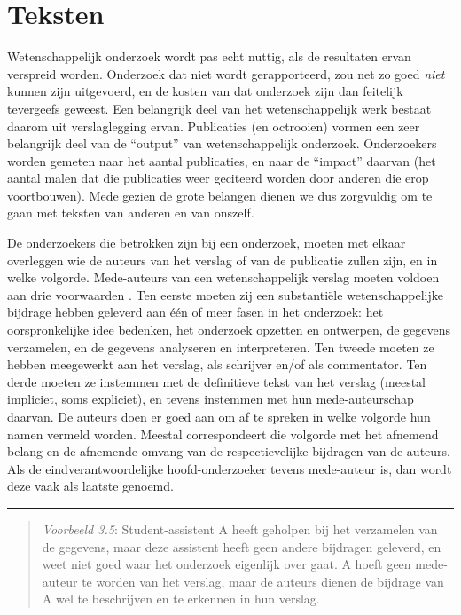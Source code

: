\documentclass[
]{book}
\begin{document}
\section{Teksten}\label{teksten}

Wetenschappelijk onderzoek wordt pas echt nuttig, als de resultaten
ervan verspreid worden. Onderzoek dat niet wordt gerapporteerd, zou net
zo goed \emph{niet} kunnen zijn uitgevoerd, en de kosten van dat onderzoek
zijn dan feitelijk tevergeefs geweest. Een belangrijk deel van het
wetenschappelijk werk bestaat daarom uit verslaglegging ervan.
Publicaties (en octrooien) vormen een zeer belangrijk deel van de
``output'' van wetenschappelijk onderzoek. Onderzoekers worden gemeten
naar het aantal publicaties, en naar de ``impact'' daarvan (het aantal
malen dat die publicaties weer geciteerd worden door anderen die erop
voortbouwen). Mede gezien de grote belangen dienen we dus zorgvuldig om
te gaan met teksten van anderen en van onszelf.

De onderzoekers die betrokken zijn bij een onderzoek, moeten met elkaar
overleggen wie de auteurs van het verslag of van de publicatie zullen
zijn, en in welke volgorde. Mede-auteurs van een wetenschappelijk
verslag moeten voldoen aan drie voorwaarden \citep[Ch.10]{ORI12}. Ten eerste
moeten zij een substantiële wetenschappelijke bijdrage hebben geleverd
aan één of meer fasen in het onderzoek: het oorspronkelijke idee
bedenken, het onderzoek opzetten en ontwerpen, de gegevens verzamelen,
en de gegevens analyseren en interpreteren. Ten tweede moeten ze hebben
meegewerkt aan het verslag, als schrijver en/of als commentator. Ten
derde moeten ze instemmen met de definitieve tekst van het verslag
(meestal impliciet, soms expliciet), en tevens instemmen met hun
mede-auteurschap daarvan. De auteurs doen er goed aan om af te spreken
in welke volgorde hun namen vermeld worden. Meestal correspondeert die
volgorde met het afnemend belang en de afnemende omvang van de
respectievelijke bijdragen van de auteurs. Als de eindverantwoordelijke
hoofd-onderzoeker tevens mede-auteur is, dan wordt deze vaak als laatste
genoemd.

\begin{center}\rule{0.5\linewidth}{0.5pt}\end{center}

\begin{quote}
\emph{Voorbeeld 3.5}:
Student-assistent A heeft geholpen bij het verzamelen van de gegevens,
maar deze assistent heeft geen andere bijdragen geleverd, en weet niet
goed waar het onderzoek eigenlijk over gaat. A hoeft geen mede-auteur te
worden van het verslag, maar de auteurs dienen de bijdrage van A wel te
beschrijven en te erkennen in hun verslag.
\end{quote}
\end{document}
